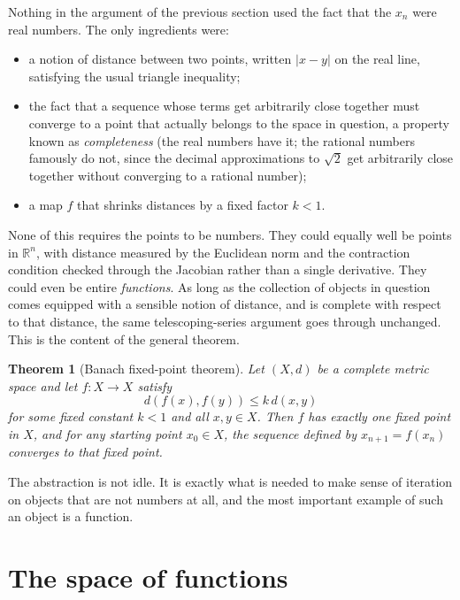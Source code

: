 \documentclass{essay}
\newtheorem*{theorem*}{Theorem}
\begin{document}
Nothing in the argument of the previous section used the fact that
the $x_n$ were real numbers. The only ingredients were:
\begin{itemize}
  \item a notion of distance between two points, written $|x - y|$
    on the real line, satisfying the usual triangle inequality;
  \item the fact that a sequence whose terms get arbitrarily close
    together must converge to a point that actually belongs to the
    space in question, a property known as \emph{completeness} (the
    real numbers have it; the rational numbers famously do not,
    since the decimal approximations to $\sqrt{2}$ get arbitrarily
    close together without converging to a rational number);
  \item a map $f$ that shrinks distances by a fixed factor $k < 1$.
\end{itemize}
None of this requires the points to be numbers. They could equally
well be points in $\mathbb{R}^n$, with distance measured by the
Euclidean norm and the contraction condition checked through the
Jacobian rather than a single derivative. They could even be entire
\emph{functions}. As long as the collection of objects in question
comes equipped with a sensible notion of distance, and is complete
with respect to that distance, the same telescoping-series argument
goes through unchanged. This is the content of the general theorem.

\begin{theorem*}[Banach fixed-point theorem]
Let $(X, d)$ be a complete metric space and let $f : X \to X$ satisfy
\[
  d(f(x), f(y)) \le k\, d(x, y)
\]
for some fixed constant $k < 1$ and all $x, y \in X$. Then $f$ has
exactly one fixed point in $X$, and for any starting point
$x_0 \in X$, the sequence defined by $x_{n+1} = f(x_n)$ converges to
that fixed point.
\end{theorem*}

The abstraction is not idle. It is exactly what is needed to make
sense of iteration on objects that are not numbers at all, and the
most important example of such an object is a function.

\section{The space of functions}
\end{document}
